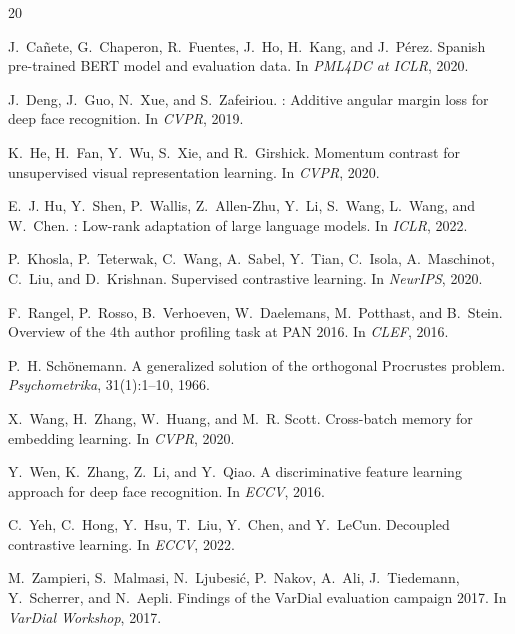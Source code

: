 \documentclass[11pt,a4paper]{article}
\begin{document}
\begin{thebibliography}{20}

J.~Ca\~nete, G.~Chaperon, R.~Fuentes, J.~Ho, H.~Kang, and J.~P\'erez.
\newblock Spanish pre-trained {BERT} model and evaluation data.
\newblock In \emph{PML4DC at ICLR}, 2020.

J.~Deng, J.~Guo, N.~Xue, and S.~Zafeiriou.
: Additive angular margin loss for deep face recognition.
\newblock In \emph{CVPR}, 2019.

K.~He, H.~Fan, Y.~Wu, S.~Xie, and R.~Girshick.
\newblock Momentum contrast for unsupervised visual representation learning.
\newblock In \emph{CVPR}, 2020.

E.~J. Hu, Y.~Shen, P.~Wallis, Z.~Allen-Zhu, Y.~Li, S.~Wang, L.~Wang, and
W.~Chen.
: Low-rank adaptation of large language models.
\newblock In \emph{ICLR}, 2022.

P.~Khosla, P.~Teterwak, C.~Wang, A.~Sabel, Y.~Tian, C.~Isola,
A.~Maschinot, C.~Liu, and D.~Krishnan.
\newblock Supervised contrastive learning.
\newblock In \emph{NeurIPS}, 2020.

F.~Rangel, P.~Rosso, B.~Verhoeven, W.~Daelemans, M.~Potthast, and B.~Stein.
\newblock Overview of the 4th author profiling task at {PAN} 2016.
\newblock In \emph{CLEF}, 2016.

P.~H. Sch\"onemann.
\newblock A generalized solution of the orthogonal {Procrustes} problem.
\newblock \emph{Psychometrika}, 31(1):1--10, 1966.

X.~Wang, H.~Zhang, W.~Huang, and M.~R. Scott.
\newblock Cross-batch memory for embedding learning.
\newblock In \emph{CVPR}, 2020.

Y.~Wen, K.~Zhang, Z.~Li, and Y.~Qiao.
\newblock A discriminative feature learning approach for deep face recognition.
\newblock In \emph{ECCV}, 2016.

C.~Yeh, C.~Hong, Y.~Hsu, T.~Liu, Y.~Chen, and Y.~LeCun.
\newblock Decoupled contrastive learning.
\newblock In \emph{ECCV}, 2022.

M.~Zampieri, S.~Malmasi, N.~Ljubesi\'c, P.~Nakov, A.~Ali, J.~Tiedemann,
Y.~Scherrer, and N.~Aepli.
\newblock Findings of the {VarDial} evaluation campaign 2017.
\newblock In \emph{VarDial Workshop}, 2017.

\end{thebibliography}
\end{document}
